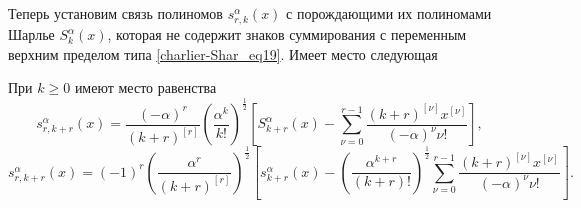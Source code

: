 Теперь установим связь полиномов $s_{r,k}^{\alpha}(x)$ с порождающими их полиномами Шарлье $S_{k}^{\alpha}(x)$, которая не содержит знаков суммирования с переменным верхним пределом типа \eqref{charlier-Shar_eq19}. Имеет место следующая
\begin{theorem}\label{charlier-Shar_thm4}
	При $k\geq 0$ имеют место равенства
	\begin{equation}\label{charlier-Shar_eq24}
	s_{r,k+r}^{\alpha}(x)=\frac{(-\alpha)^r}{(k+r)^{[r]}} \left( \frac{\alpha^k}{k!} \right)^{\frac 12} \left[S_{k+r}^{\alpha}(x)-\sum_{\nu=0}^{r-1}\frac{(k+r)^{[\nu]}x^{[\nu]}}{(-\alpha)^\nu \nu!}\right] ,
	\end{equation}
	\begin{equation}\label{charlier-Shar_eq25}
	s_{r,k+r}^{\alpha}(x)=(-1)^r \left(\frac{\alpha^r}{(k+r)^{[r]}}\right)^{\frac 12}
	\left[s_{k+r}^{\alpha}(x) - \left( \frac{\alpha^{k+r}}{(k+r)!} \right)^{\frac12}\sum_{\nu=0}^{r-1}\frac{(k+r)^{[\nu]}x^{[\nu]}}{(-\alpha)^\nu \nu!}\right] .
	\end{equation}
\end{theorem}
%
%





